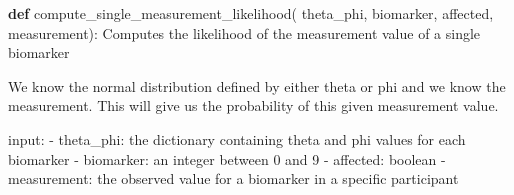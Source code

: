 \documentclass[
  letterpaper,
  DIV=11,
  numbers=noendperiod]{scrreprt}
\newenvironment{Shaded}{\begin{snugshade}}{\end{snugshade}}
\newcommand{\CommentTok}[1]{\textcolor[rgb]{0.37,0.37,0.37}{#1}}
\newcommand{\KeywordTok}[1]{\textcolor[rgb]{0.00,0.23,0.31}{\textbf{#1}}}
\newcommand{\NormalTok}[1]{\textcolor[rgb]{0.00,0.23,0.31}{#1}}
\begin{document}
\begin{Shaded}
\begin{Highlighting}[]
\KeywordTok{def}\NormalTok{ compute\_single\_measurement\_likelihood(}
\NormalTok{        theta\_phi, }
\NormalTok{        biomarker, }
\NormalTok{        affected, }
\NormalTok{        measurement):}
    \CommentTok{\textquotesingle{}\textquotesingle{}\textquotesingle{}Computes the likelihood of the measurement value of a single biomarker}

\CommentTok{    We know the normal distribution defined by either theta or phi}
\CommentTok{    and we know the measurement. This will give us the probability}
\CommentTok{    of this given measurement value. }

\CommentTok{    input:}
\CommentTok{    {-} theta\_phi: the dictionary containing theta and phi values for each biomarker}
\CommentTok{    {-} biomarker: an integer between 0 and 9 }
\CommentTok{    {-} affected: boolean }
\CommentTok{    {-} measurement: the observed value for a biomarker in a specific participant}


\end{Highlighting}
\end{Shaded}
\end{document}
